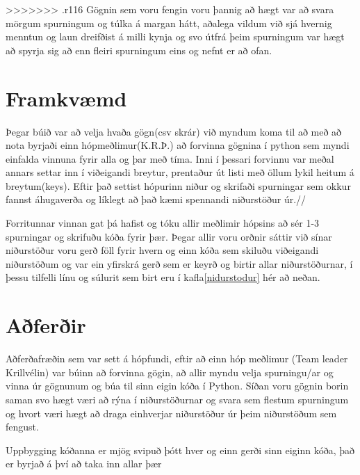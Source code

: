 \documentclass[12pt, svn, draft]{rureport}
\begin{document}
>>>>>>> .r116
Gögnin sem voru fengin voru þannig að hægt var að svara mörgum spurningum og túlka á margan hátt, aðalega vildum við sjá hvernig menntun og laun dreifðist á milli kynja og svo útfrá þeim spurningum var hægt að spyrja sig að enn fleiri spurningum eins og nefnt er að ofan.





\section{Framkvæmd}

Þegar búið var að velja hvaða gögn(csv skrár) við myndum koma til að með að nota byrjaði einn hópmeðlimur(K.R.Þ.) að forvinna gögnina í python sem myndi einfalda vinnuna fyrir alla og þar með tíma. Inni í þessari forvinnu var meðal annars settar inn í viðeigandi breytur, prentaður út listi með öllum lykil heitum á breytum(keys). Eftir það settist hópurinn niður og skrifaði spurningar sem okkur fannst áhugaverða og líklegt að það kæmi spennandi niðurstöður úr.//

Forritunnar vinnan gat þá hafist og tóku allir meðlimir hópsins að sér 1-3 spurningar og skrifuðu kóða fyrir þær. Þegar allir voru orðnir sáttir við sínar niðurstöður voru gerð föll fyrir hvern og einn kóða sem skiluðu viðeigandi niðurstöðum og var ein yfirskrá gerð sem er keyrð og birtir allar niðurstöðurnar, í þessu tilfelli línu og súlurit sem birt eru í kafla\ref{nidurstodur} hér að neðan.

\section{Aðferðir}

Aðferðafræðin sem var sett á hópfundi, eftir að einn hóp meðlimur (Team leader Krillvélin) var búinn að forvinna gögin, að allir myndu velja spurningu/ar og vinna úr gögnunum og búa til sinn eigin kóða í Python. Síðan voru gögnin borin saman svo hægt væri að rýna í niðurstöðurnar og svara sem flestum spurningum og hvort væri hægt að draga einhverjar niðurstöður úr þeim niðurstöðum sem fengust.

Uppbygging kóðanna er mjög svipuð þótt hver og einn gerði sinn eiginn kóða, það er byrjað á því að taka inn allar þær 
 
\end{document}
